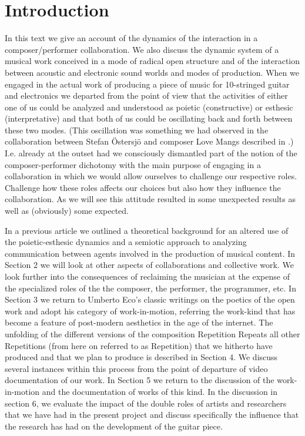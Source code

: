 
\section{Introduction}
\label{sec:introduction-1}


In this text we give an account of the dynamics of the interaction in
a composer/performer collaboration. We also discuss the dynamic system
of a musical work conceived in a mode of radical open structure and of
the interaction between acoustic and electronic sound worlds and modes
of production. When we engaged in the actual work of producing a piece
of music for 10-stringed guitar and electronics we departed from the
point of view that the activities of either one of us could be
analyzed and understood as poietic (constructive) or esthesic
(interpretative) and that both of us could be oscillating back and
forth between these two modes. (This oscillation was something we had
observed in the collaboration between Stefan \"{O}stersj\"{o} and
composer Love Mangs described in \citet{frisk-ost06}.) I.e. already at
the outset had we consciously dismantled part of the notion of the
composer-performer dichotomy with the main purpose of engaging in a
collaboration in which we would allow ourselves to challenge our
respective roles. Challenge how these roles affects our choices but
also how they influence the collaboration. As we will see this
attitude resulted in some unexpected results as well as (obviously)
some expected.

In a previous article \citep{frisk-ost06-2} we outlined a theoretical
background for an altered use of the poietic-esthesic dynamics and a
semiotic approach to analyzing communication between agents involved
in the production of musical content. In Section 2 we will look at
other aspects of collaborations and collective work. We look further
into the consequences of reclaiming the musician at the expense of the
specialized roles of the the composer, the performer, the programmer,
etc. In Section 3 we return to Umberto Eco's classic writings on the
poetics of the open work and adopt his category of work-in-motion,
referring the work-kind that has become a feature of post-modern
aesthetics in the age of the internet. The unfolding of the different
versions of the composition Repetition Repeats all other Repetitions
(from here on referred to as Repetition) that we hitherto have
produced and that we plan to produce is described in Section 4. We
discuss several instances within this process from the point of
departure of video documentation of our work. In Section 5 we return
to the discussion of the work-in-motion and the documentation of works
of this kind. In the discussion in section 6, we evaluate the impact
of the double roles of artists and researchers that we have had in the
present project and discuss specifically the influence that the
research has had on the development of the guitar piece.


